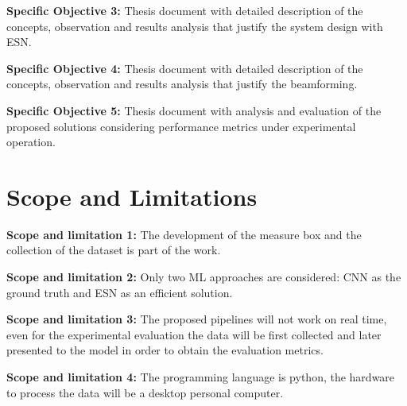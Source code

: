\textbf{Specific Objective 3:}
Thesis document with detailed description of the concepts, observation and results analysis that justify the system design with ESN.

\textbf{Specific Objective 4:}
Thesis document with detailed description of the concepts, observation and results analysis that justify the beamforming.

\textbf{Specific Objective 5:}
Thesis document with analysis and evaluation of the proposed solutions considering performance metrics under experimental operation.  

\section{Scope and Limitations}


\textbf{Scope and limitation 1:} 
The development of the measure box and the collection of the dataset is part of the work. 

\textbf{Scope and limitation 2:}
Only two ML approaches are considered: CNN as the ground truth and ESN as an efficient solution.    

\textbf{Scope and limitation 3:} 
The proposed pipelines will not work on real time, even for the experimental evaluation the data will be first collected and later presented to the model in order to obtain the evaluation metrics.

\textbf{Scope and limitation 4:} 
The programming language is python, the hardware to process the data will be a desktop personal computer.